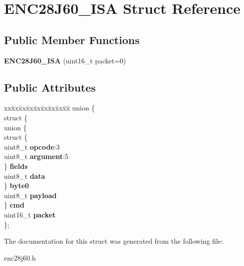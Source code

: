 \hypertarget{structENC28J60__ISA}{}\section{E\+N\+C28\+J60\+\_\+\+I\+SA Struct Reference}
\label{structENC28J60__ISA}
\subsection*{Public Member Functions}
\begin{DoxyCompactItemize}
\item 
\mbox{\label{structENC28J60__ISA_a79c2254ac740145cea5d92bd14e35a0c}} 
{\bfseries E\+N\+C28\+J60\+\_\+\+I\+SA} (uint16\+\_\+t packet=0)
\end{DoxyCompactItemize}
\subsection*{Public Attributes}
\begin{DoxyCompactItemize}
\item 
\mbox{\label{structENC28J60__ISA_a10bc49b8ef6d4f91a6f2302758c1fb71}} 
\begin{tabbing}
xx\=xx\=xx\=xx\=xx\=xx\=xx\=xx\=xx\=\kill
union \{\\
\>struct \{\\
\>\>union \{\\
\>\>\>struct \{\\
\>\>\>\>uint8\_t {\bfseries opcode}:3\\
\>\>\>\>uint8\_t {\bfseries argument}:5\\
\>\>\>\} {\bfseries fields}\\
\>\>\>uint8\_t {\bfseries data}\\
\>\>\} {\bfseries byte0}\\
\>\>uint8\_t {\bfseries payload}\\
\>\} {\bfseries cmd}\\
\>uint16\_t {\bfseries packet}\\
\}; \\

\end{tabbing}\end{DoxyCompactItemize}


The documentation for this struct was generated from the following file\+:\begin{DoxyCompactItemize}
\item 
enc28j60.\+h\end{DoxyCompactItemize}
